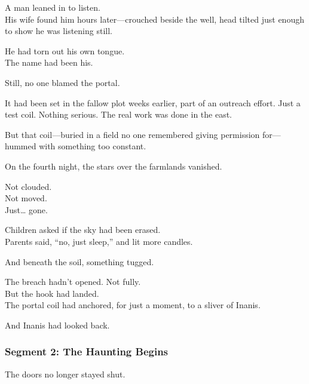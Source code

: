 \documentclass[9pt]{article}
\begin{document}
\vspace{0.5em}
A man leaned in to listen.\\
His wife found him hours later---crouched beside the well, head tilted just enough to show he was listening still.

\vspace{0.5em}
He had torn out his own tongue.\\
The name had been his.

\vspace{0.5em}
Still, no one blamed the portal.

\vspace{0.5em}
It had been set in the fallow plot weeks earlier, part of an outreach effort. Just a test coil. Nothing serious. The real work was done in the east.

\vspace{0.5em}
But that coil---buried in a field no one remembered giving permission for---hummed with something too constant.

\vspace{0.5em}
On the fourth night, the stars over the farmlands vanished.

\vspace{0.5em}
Not clouded.\\
Not moved.\\
Just\ldots{} gone.

\vspace{0.5em}
Children asked if the sky had been erased.\\
Parents said, ``no, just sleep,'' and lit more candles.

\vspace{0.5em}
And beneath the soil, something tugged.

\vspace{0.5em}
The breach hadn’t opened. Not fully.\\
But the hook had landed.\\
The portal coil had anchored, for just a moment, to a sliver of Inanis.

\vspace{0.5em}
And Inanis had looked back.

\newpage

\subsubsection*{Segment 2: The Haunting Begins}

The doors no longer stayed shut.
\end{document}
